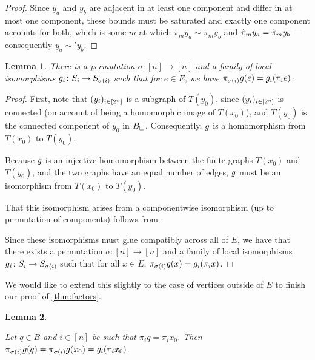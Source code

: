 \documentclass{amsart}
\newtheorem{lemma}{Lemma}[section]
\theoremstyle{definition}
\begin{document}
\begin{proof}
  Since $y_a$ and $y_b$ are adjacent in at least one component and differ in at most one component, these bounds must be saturated and exactly one component accounts for both, which is some $m$ at which $\pi_{m} y_a \sim \pi_{m} y_b$ and $\hat{\pi}_{m} y_a = \hat{\pi}_{m} y_b$ --- consequently $y_a \sim' y_b$.
\end{proof}


\begin{lemma} 

  There is a permutation $\sigma \colon  [n]\to[n]$ and a family of local isomorphisms $g_i  \colon  S_i \to S_{\sigma(i)}$ such that for $e \in E$, we have $\pi_{\sigma(i)} g(e) = g_i (\pi_i e)$.
\end{lemma}


\begin{proof} 

First, note that $(y_i)_{i \in [2^n]}$ is a subgraph of $T(y_0)$, since $(y_i)_{i \in [2^n]}$ is connected (on account of being a homomorphic image of $T(x_0)$), and $T(y_0)$ is the connected component of $y_0$ in $B_\square$. Consequently, $g$ is a homomorphism from $T(x_0)$ to $T(y_0)$.

Because $g$ is an injective homomorphism between the finite graphs $T(x_0)$
and $T(y_0)$, and the two graphs have an equal number of edges, $g$ must be an isomorphism from $T(x_0)$ to $T(y_0)$.

That this isomorphism arises from a componentwise isomorphism (up to permutation of components) follows from \autocite[Theorem 6.8]{handbook}.

Since these isomorphisms must glue compatibly across all of $E$, we have that there exists a permutation $\sigma  \colon  [n] \to [n]$ and a family of local isomorphisms $g_i  \colon  S_i \to S_{\sigma(i)}$ such that for all $x \in E$, $\pi_{\sigma(i)} g(x) = g_i (\pi_i x)$.
\end{proof}


We would like to extend this slightly to the case of vertices outside of $E$ to finish our proof of  \autoref{thm:factors}.

\begin{lemma} \label{lem:interior}

  Let $q \in B$ and $i \in [n]$ be such that $\pi_i q = \pi_i x_0$. Then $\pi_{\sigma(i)} g(q) = \pi_{\sigma(i)} g(x_0) = g_i (\pi_i x_0)$.
  \end{lemma}
\end{document}
